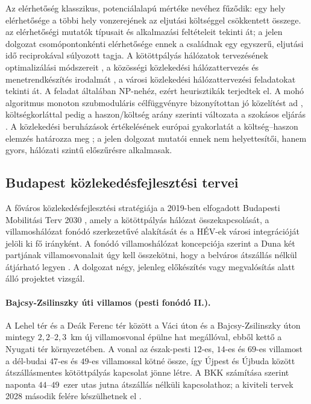 \documentclass[12pt,a4paper]{article}
\theoremstyle{definition}
\theoremstyle{remark}
\begin{document}
Az elérhetőség klasszikus, potenciálalapú mértéke \citet{hansen1959} nevéhez
fűződik: egy hely elérhetősége a többi hely vonzerejének az eljutási
költséggel csökkentett összege. \citet{geurs2004} az elérhetőségi mutatók
típusait és alkalmazási feltételeit tekinti át; a jelen dolgozat
csomópontonkénti elérhetősége ennek a családnak egy egyszerű,
eljutási idő reciprokával súlyozott tagja. A kötöttpályás hálózatok
tervezésének optimalizálási módszereit \citet{laporte2000}, a közösségi
közlekedési hálózattervezés és menetrendkészítés irodalmát
\citet{guihaire2008}, a városi közlekedési hálózattervezési feladatokat
\citet{farahani2013} tekinti át. A feladat általában NP-nehéz, ezért
heurisztikák terjedtek el. A mohó algoritmus monoton szubmoduláris
célfüggvényre bizonyítottan jó közelítést ad \citep{nemhauser1978},
költségkorláttal pedig a haszon/költség arány szerinti változata a szokásos
eljárás \citep{khuller1999}. A közlekedési beruházások értékelésének európai
gyakorlatát a költség--haszon elemzés határozza meg \citep{ec2014}; a jelen
dolgozat mutatói ennek nem helyettesítői, hanem gyors, hálózati szintű
előszűrésre alkalmasak.

\subsection{Budapest közlekedésfejlesztési tervei}

A főváros közlekedésfejlesztési stratégiája a 2019-ben elfogadott Budapesti
Mobilitási Terv 2030 \citep{bmt2019}, amely a kötöttpályás hálózat
összekapcsolását, a villamoshálózat fonódó szerkezetűvé alakítását és a HÉV-ek
városi integrációját jelöli ki fő irányként. A fonódó villamoshálózat
koncepciója szerint a Duna két partjának villamosvonalait úgy kell
összekötni, hogy a belváros átszállás nélkül átjárható legyen
\citep{fonodo2030}. A dolgozat négy, jelenleg előkészítés vagy megvalósítás
alatt álló projektet vizsgál.

\paragraph{Bajcsy-Zsilinszky úti villamos (pesti fonódó II.).}
A Lehel tér és a Deák Ferenc tér között a Váci úton és a Bajcsy-Zsilinszky
úton mintegy $2{,}2$--$2{,}3$~km új villamosvonal épülne hat megállóval, ebből
kettő a Nyugati tér környezetében. A vonal az észak-pesti $12$-es, $14$-es és
$69$-es villamost a dél-budai $47$-es és $49$-es villamossal kötné össze, így
Újpest és Újbuda között átszállásmentes kötöttpályás kapcsolat jönne létre. A
BKK számítása szerint naponta $44$--$49$~ezer utas jutna átszállás nélküli
kapcsolathoz; a kiviteli tervek 2028 második felére készülhetnek el
\citep{bkk2024fonodo, pestbuda2025}.
\end{document}
